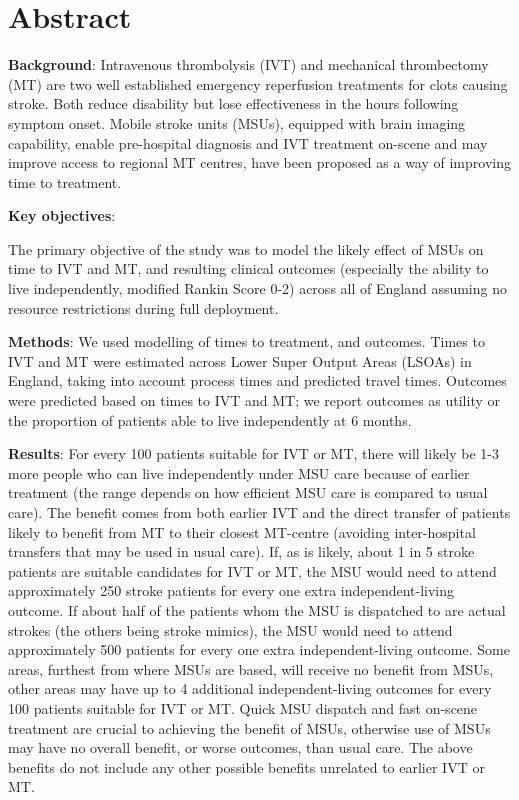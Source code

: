 \section*{Abstract}

\textbf{Background}: Intravenous thrombolysis (IVT) and mechanical thrombectomy (MT) are two well established emergency reperfusion treatments for clots causing stroke. Both reduce disability but lose effectiveness in the hours following symptom onset. Mobile stroke units (MSUs), equipped with brain imaging capability, enable pre-hospital diagnosis and IVT treatment on-scene and may improve access to regional MT centres, have been proposed as a way of improving time to treatment.

\textbf{Key objectives}:

The primary objective of the study was to model the likely effect of MSUs on time to IVT and MT, and resulting clinical outcomes (especially the ability to live independently, modified Rankin Score 0-2) across all of England assuming no resource restrictions during full deployment.

\textbf{Methods}: We used modelling of times to treatment, and outcomes. Times to IVT and MT were estimated across Lower Super Output Areas (LSOAs) in England, taking into account process times and predicted travel times. Outcomes were predicted based on times to IVT and MT; we report outcomes as utility or the proportion of patients able to live independently at 6 months.

\textbf{Results}: For every 100 patients suitable for IVT or MT, there will likely be 1-3 more people who can live independently under MSU care because of earlier treatment (the range depends on how efficient MSU care is compared to usual care). The benefit comes from both earlier IVT and the direct transfer of patients likely to benefit from MT to their closest MT-centre (avoiding inter-hospital transfers that may be used in usual care). If, as is likely, about 1 in 5 stroke patients are suitable candidates for IVT or MT, the MSU would need to attend approximately 250 stroke patients for every one extra independent-living outcome. If about half of the patients whom the MSU is dispatched to are actual strokes (the others being stroke mimics), the MSU would need to attend approximately 500 patients for every one extra independent-living outcome. Some areas, furthest from where MSUs are based, will receive no benefit from MSUs, other areas may have up to 4 additional independent-living outcomes for every 100 patients suitable for IVT or MT. Quick MSU dispatch and fast on-scene treatment are crucial to achieving the benefit of MSUs, otherwise use of MSUs may have no overall benefit, or worse outcomes, than usual care. The above benefits do not include any other possible benefits unrelated to earlier IVT or MT.

